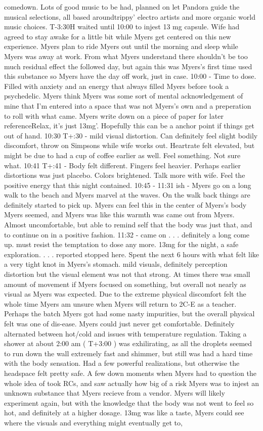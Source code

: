 \documentclass[12pt]{book}
\begin{document}
comedown. Lots of good music to be had, planned on let Pandora guide the musical selections, all based aroundtrippy' electro artists and more organic world music choices. T-3:30H waited until 10:00 to injest 13 mg capsule. Wife had agreed to stay awake for a little bit while Myers get centered on this new experience. Myers plan to ride Myers out until the morning and sleep while Myers was away at work. From what Myers understand there shouldn't be too much residual effect the followed day, but again this was Myers's first time used this substance so Myers have the day off work, just in case. 10:00 - Time to dose. Filled with anxiety and an energy that always filled Myers before took a psychedelic. Myers think Myers was some sort of mental acknowledgement of mine that I'm entered into a space that was not Myers's own and a preperation to roll with what came. Myers write down on a piece of paper for later referenceRelax, it's just 13mg'. Hopefully this can be a anchor point if things get out of hand. 10:30 T+:30 - mild visual distortion. Can definitely feel slight bodily discomfort, throw on Simpsons while wife works out. Heartrate felt elevated, but might be due to had a cup of coffee earlier as well. Feel something. Not sure what. 10:41 T+:41 - Body felt different. Fingers feel heavier. Perhaps earlier distortions was just placebo. Colors brightened. Talk more with wife. Feel the positive energy that this night contained. 10:45 - 11:31 ish - Myers go on a long walk to the beach and Myers marvel at the waves. On the walk back things are definitely started to pick up. Myers can feel this in the center of Myers's body Myers seemed, and Myers was like this warmth was came out from Myers. Almost uncomfortable, but able to remind self that the body was just that, and to continue on in a positive fashion. 11:32 - came on  . . .  definitely a long come up. must resist the temptation to dose any more. 13mg for the night, a safe exploration.  . . .  reported stopped here. Spent the next 6 hours with what felt like a very tight knot in Myers's stomach. mild visuals, definitely perception distortion but the visual element was not that strong. At times there was small amount of movement if Myers focused on something, but overall not nearly as visual as Myers was expected. Due to the extreme physical discomfort felt the whole time Myers am unsure when Myers will return to 2C-E as a teacher. Perhaps the batch Myers got had some nasty impurities, but the overall physical felt was one of dis-ease. Myers could just never get comfortable. Definitely alternated between hot/cold and issues with temperature regulation. Taking a shower at about 2:00 am ( T+3:00 ) was exhilirating, as all the droplets seemed to run down the wall extremely fast and shimmer, but still was had a hard time with the body sensation. Had a few powerful realizations, but otherwise the headspace felt pretty safe. A few down moments when Myers had to question the whole idea of took RCs, and saw actually how big of a risk Myers was to injest an unknown substance that Myers recieve from a vendor. Myers will likely experiment again, but with the knowledge that the body was not went to feel so hot, and definitely at a higher dosage. 13mg was like a taste, Myers could see where the visuals and everything might eventually get to, 
\end{document}
